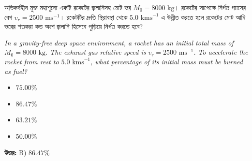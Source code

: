 \documentclass[12pt, a4paper]{article}
\begin{document}
\begin{tcolorbox}[questionbox={প্রশ্ন (Question) 41}]
\noindent
অভিকর্ষহীন মুক্ত মহাশূন্যে একটি রকেটের জ্বালানিসহ মোট ভর $M_0 = 8000\text{ kg}$। রকেটের সাপেক্ষে নির্গত গ্যাসের বেগ $v_r = 2500\text{ ms}^{-1}$। রকেটটির দ্রুতি স্থিরাবস্থা থেকে $5.0\text{ kms}^{-1}$ এ উন্নীত করতে হলে রকেটের মোট আদি ভরের শতকরা কত অংশ জ্বালানি হিসেবে পুড়িয়ে নির্গত করতে হবে?
\vspace{0.8em}
\begin{english}
\noindent\textit{\color{darkgray}
In a gravity-free deep space environment, a rocket has an initial total mass of $M_0 = 8000\text{ kg}$. The exhaust gas relative speed is $v_r = 2500\text{ ms}^{-1}$. To accelerate the rocket from rest to $5.0\text{ kms}^{-1}$, what percentage of its initial mass must be burned as fuel?
}
\end{english}
\end{tcolorbox}

\begin{itemize}[label={}, leftmargin=1cm, itemsep=0.5em]
\item[\textbf{A)}] $75.00\%$
\item[\textbf{B)}] $86.47\%$
\item[\textbf{C)}] $63.21\%$
\item[\textbf{D)}] $50.00\%$
\end{itemize}
\vspace{0.5em}

\begin{tcolorbox}[answerbox]
\textbf{\color{success} উত্তর:} B) $86.47\%$
\end{tcolorbox}
\vspace{1em}
\end{document}
